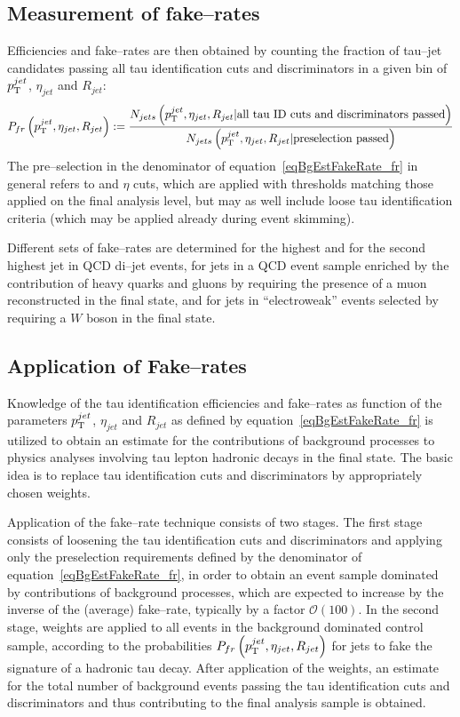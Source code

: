 \subsection{Measurement of fake--rates}

Efficiencies and fake--rates are then obtained by counting the fraction of tau--jet candidates
passing all tau identification cuts and discriminators
in a given bin of $p_{\mathrm{T}}^{jet}$, $\eta_{jet}$ and $R_{jet}$:
\begin{equation}
P_{fr} \left( p_{\mathrm{T}}^{jet}, \eta_{jet}, R_{jet} \right) := 
  \frac{N_{jets} \left( p_{\mathrm{T}}^{jet}, \eta_{jet}, R_{jet} \vert \mbox{all tau ID cuts and discriminators passed} \right)}
       {N_{jets} \left( p_{\mathrm{T}}^{jet}, \eta_{jet}, R_{jet} \vert \mbox{preselection passed} \right)}
\label{eqBgEstFakeRate_fr}
\end{equation}
The pre--selection in the denominator of equation~\ref{eqBgEstFakeRate_fr} in
general refers to \pt and $\eta$ cuts, which are applied with thresholds
matching those applied on the final analysis level, but may as well include
loose tau identification criteria (which may be applied \eg already during event
skimming).

Different sets of fake--rates are determined for the highest \pt and for the
second highest \pt jet in QCD di--jet events, for jets in a QCD event sample
enriched by the contribution of heavy quarks and gluons by requiring the
presence of a muon reconstructed in the final state, and for jets in
``electroweak'' events selected by requiring a $W$ boson in the final state.

\subsection{Application of Fake--rates}
\label{sec:FakeRateApplication}

Knowledge of the tau identification efficiencies and fake--rates as function of
the parameters $p_{\mathrm{T}}^{jet}$, $\eta_{jet}$ and $R_{jet}$ as defined by
equation~\ref{eqBgEstFakeRate_fr} is utilized to obtain an estimate for the
contributions of background processes to physics analyses involving tau lepton
hadronic decays in the final state.  The basic idea is to replace tau
identification cuts and discriminators by appropriately chosen weights.

Application of the fake--rate technique consists of two stages.  The first stage
consists of loosening the tau identification cuts and discriminators and
applying only the preselection requirements defined by the denominator of
equation~\ref{eqBgEstFakeRate_fr}, in order to obtain an event sample dominated
by contributions of background processes, which are expected to increase by the
inverse of the (average) fake--rate, typically by a factor $\mathcal{O} \left(
100 \right)$.  In the second stage, weights are applied to all events in the
background dominated control sample, according to the probabilities $P_{fr}
\left( p_{\mathrm{T}}^{jet}, \eta_{jet}, R_{jet} \right)$ for jets to fake the signature
of a hadronic tau decay.  After application of the weights, an estimate for the
total number of background events passing the tau identification cuts and
discriminators and thus contributing to the final analysis sample is obtained.

